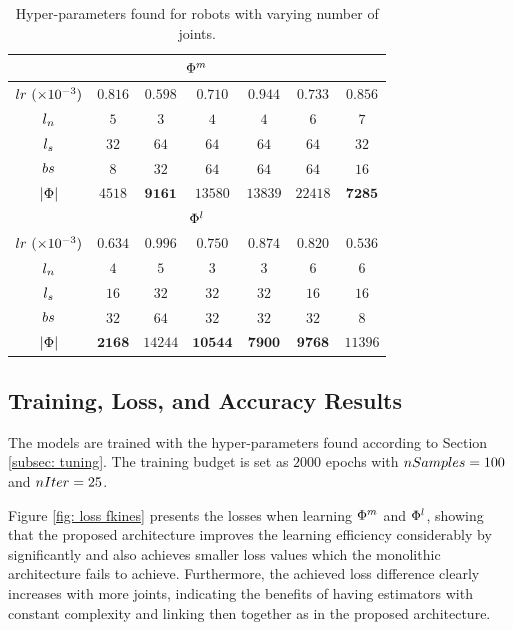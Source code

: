 \begin{table}[h]
	\centering
	\caption{Hyper-parameters found for robots with varying number of joints.}
	\label{tab: tune fkine}
	\begin{tabulary}{\linewidth}{c|c|c|c|c|c|c}
		\toprule
		\\\hline
		$lr~(\times10^{-3})$ & $0.816$ & $0.598$ & $0.710$ & $0.944$ & $0.733$ & $0.856$ \\\hline
		$l_n$ & $5$ & $3$ & $4$ & $4$ & $6$ & $7$	 \\\hline
		$l_s$ & $32$ & $64$ & $64$ & $64$ & $64$ & $32$ \\\hline
		$bs$ & $8$ & $32$ & $64$ & $64$ & $64$ & $16$ \\\hline
		$|\Phi|$ & $4518$ & $\mathbf{9161}$ & $13580$ & $13839$ & $22418$ & $\mathbf{7285}$ \\
		\midrule
		\\\hline
		$lr~(\times10^{-3})$ & $0.634$ & $0.996$ & $0.750$ & $0.874$ & $0.820$ & $0.536$ \\\hline
		$l_n$ & $4$ & $5$ & $3$ & $3$ & $6$ & $6$ \\\hline
		$l_s$ & $16$ & $32$ & $32$ & $32$ & $16$ & $16$ \\\hline
		$bs$ & $32$ & $64$ & $32$ & $32$ & $32$ & $8$ \\\hline
		$|\Phi|$ & $\mathbf{2168}$ & $14244$ & $\mathbf{10544}$ & $\mathbf{7900}$ & $\mathbf{9768}$ & $11396$ \\
		\bottomrule
	\end{tabulary}
\end{table}

\subsection{Training, Loss, and Accuracy Results}\label{subsec: loss and acc}

The models are trained with the hyper-parameters found according to Section \ref{subsec: tuning}.
%
The training budget is set as $2000$ epochs with $nSamples=100$ and $nIter=25$.

Figure \ref{fig: loss fkines} presents the losses when learning $\Phi^{m}$ and $\Phi^{l}$, showing that the proposed architecture improves the learning efficiency considerably by significantly and also achieves smaller loss values which the monolithic architecture fails to achieve.
%
Furthermore, the achieved loss difference clearly increases with more joints, indicating the benefits of having estimators with constant complexity and linking then together as in the proposed architecture.

